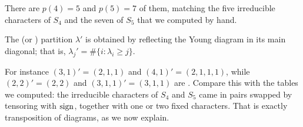 \documentclass[a4paper]{scrartcl}
\begin{document}
\begin{center}
\end{center}
\vspace{0.5em}

There are $p(4) = 5$ and $p(5) = 7$ of them, matching the five irreducible characters of $S_4$ and the seven of $S_5$ that we computed by hand.

\begin{definition}
	The  (or ) partition $\lambda'$ is obtained by reflecting the Young diagram in its main diagonal; that is, $\lambda_j' = \#\{i : \lambda_i \geq j\}$.
\end{definition}

For instance $(3,1)' = (2,1,1)$ and $(4,1)' = (2,1,1,1)$, while $(2,2)' = (2,2)$ and $(3,1,1)' = (3,1,1)$ are . Compare this with the tables we computed: the irreducible characters of $S_4$ and $S_5$ came in pairs swapped by tensoring with $\operatorname{sign}$, together with one or two fixed characters. That is exactly transposition of diagrams, as we now explain.
\end{document}
